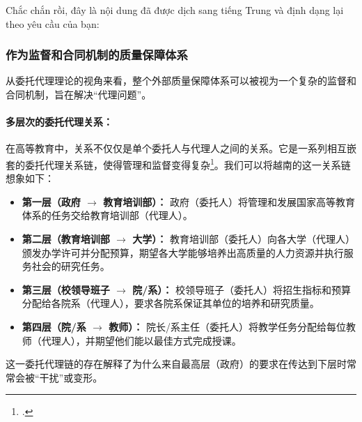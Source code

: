 
Chắc chắn rồi, đây là nội dung đã được dịch sang tiếng Trung và định dạng lại theo yêu cầu của bạn:


\subsubsection{作为监督和合同机制的质量保障体系}

从委托代理理论的视角来看，整个外部质量保障体系可以被视为一个复杂的监督和合同机制，旨在解决“代理问题”。

\paragraph{多层次的委托代理关系：}
在高等教育中，关系不仅仅是单个委托人与代理人之间的关系。它是一系列相互嵌套的委托代理关系链，使得管理和监督变得复杂\footcite{Borgos2013}。我们可以将越南的这一关系链想象如下：
\begin{itemize}
    \item \textbf{第一层（政府 $\rightarrow$ 教育培训部）：} 政府（委托人）将管理和发展国家高等教育体系的任务交给教育培训部（代理人）。
    \item \textbf{第二层（教育培训部 $\rightarrow$ 大学）：} 教育培训部（委托人）向各大学（代理人）颁发办学许可并分配预算，期望各大学能够培养出高质量的人力资源并执行服务社会的研究任务。
    \item \textbf{第三层（校领导班子 $\rightarrow$ 院/系）：} 校领导班子（委托人）将招生指标和预算分配给各院系（代理人），要求各院系保证其单位的培养和研究质量。
    \item \textbf{第四层（院/系 $\rightarrow$ 教师）：} 院长/系主任（委托人）将教学任务分配给每位教师（代理人），并期望他们能以最佳方式完成授课。
\end{itemize}
这一委托代理链的存在解释了为什么来自最高层（政府）的要求在传达到下层时常常会被“干扰”或变形。

